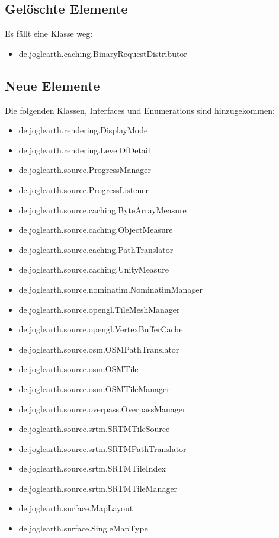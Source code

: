 \documentclass[10pt]{scrreprt}
\begin{document}
\subsection*{Gelöschte Elemente}
Es fällt eine Klasse weg:

\begin{itemize}
\item de.joglearth.caching.BinaryRequestDistributor
\end{itemize}

\subsection*{Neue Elemente}
Die folgenden Klassen, Interfaces und Enumerations sind hinzugekommen:

\begin{itemize}
\item de.joglearth.rendering.DisplayMode
\item de.joglearth.rendering.LevelOfDetail
\item de.joglearth.source.ProgressManager
\item de.joglearth.source.ProgressListener
\item de.joglearth.source.caching.ByteArrayMeasure
\item de.joglearth.source.caching.ObjectMeasure
\item de.joglearth.source.caching.PathTranslator
\item de.joglearth.source.caching.UnityMeasure
\item de.joglearth.source.nominatim.NominatimManager
\item de.joglearth.source.opengl.TileMeshManager
\item de.joglearth.source.opengl.VertexBufferCache
\item de.joglearth.source.osm.OSMPathTranslator
\item de.joglearth.source.osm.OSMTile
\item de.joglearth.source.osm.OSMTileManager
\item de.joglearth.source.overpass.OverpassManager
\item de.joglearth.source.srtm.SRTMTileSource
\item de.joglearth.source.srtm.SRTMPathTranslator
\item de.joglearth.source.srtm.SRTMTileIndex
\item de.joglearth.source.srtm.SRTMTileManager
\item de.joglearth.surface.MapLayout
\item de.joglearth.surface.SingleMapType

\end{itemize}
\end{document}
